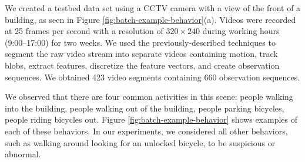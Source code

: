 We created a testbed data set using a CCTV camera with a view of the
front of a building, as seen in
Figure \ref{fig:batch-example-behavior}(a). Videos were recorded at 25
frames per second with a resolution of $320 \times 240$ during working
hours (9:00--17:00) for two weeks. We used the previously-described
techniques to segment the raw video stream into separate videos
containing motion, track blobs, extract features, discretize the
feature vectors, and create observation sequences. We obtained 423
video segments containing 660 observation sequences.

We observed that there are four common activities in this scene:
people walking into the building, people walking out of the building,
people parking bicycles, \DIFdelbegin {}\DIFdelend people riding bicycles out\DIFaddbegin {}\DIFaddend . 
Figure \ref{fig:batch-example-behavior} shows examples of 
each of these behaviors. In our experiments, we considered all other 
behaviors, such as walking around looking for an unlocked bicycle, to 
be suspicious or abnormal. 

